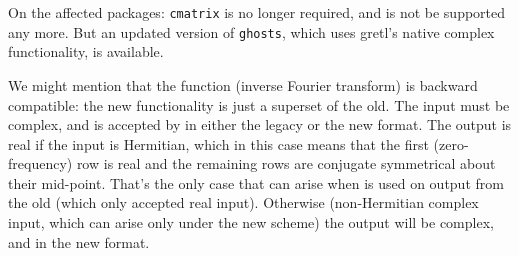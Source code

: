 On the affected packages: \texttt{cmatrix} is no longer required, and
is not be supported any more. But an updated version of
\texttt{ghosts}, which uses gretl's native complex functionality, is
available.

We might mention that the  function (inverse Fourier
transform) is backward compatible: the new functionality is just a
superset of the old. The input must be complex, and is accepted by
 in either the legacy or the new format. The output is
real if the input is Hermitian, which in this case means that the
first (zero-frequency) row is real and the remaining rows are
conjugate symmetrical about their mid-point. That's the only case that
can arise when  is used on output from the old
 (which only accepted real input).  Otherwise
(non-Hermitian complex input, which can arise only under the new
scheme) the output will be complex, and in the new format.

